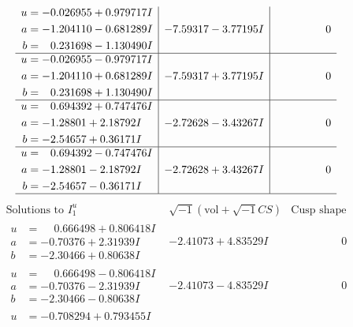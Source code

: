 \documentclass[1p]{elsarticle_modified}
\theoremstyle{definition}
\newcommand{\I}{\sqrt{-1}}
\begin{document}
$$\begin{array}{c|c|c}
\begin{aligned}
u &= -0.026955 + 0.979717 I \\
a &= -1.204110 - 0.681289 I \\
b &= \phantom{-}0.231698 - 1.130490 I\end{aligned}
 & -7.59317 - 3.77195 I & \phantom{-0.000000 } 0 \\ \hline\begin{aligned}
u &= -0.026955 - 0.979717 I \\
a &= -1.204110 + 0.681289 I \\
b &= \phantom{-}0.231698 + 1.130490 I\end{aligned}
 & -7.59317 + 3.77195 I & \phantom{-0.000000 } 0 \\ \hline\begin{aligned}
u &= \phantom{-}0.694392 + 0.747476 I \\
a &= -1.28801 + 2.18792 I \\
b &= -2.54657 + 0.36171 I\end{aligned}
 & -2.72628 - 3.43267 I & \phantom{-0.000000 } 0 \\ \hline\begin{aligned}
u &= \phantom{-}0.694392 - 0.747476 I \\
a &= -1.28801 - 2.18792 I \\
b &= -2.54657 - 0.36171 I\end{aligned}
 & -2.72628 + 3.43267 I & \phantom{-0.000000 } 0\\
 \hline 
 \end{array}$$\newpage$$\begin{array}{c|c|c}  
\text{Solutions to }I^u_{1}& \I (\text{vol} + \sqrt{-1}CS) & \text{Cusp shape}\\
 \hline 
\begin{aligned}
u &= \phantom{-}0.666498 + 0.806418 I \\
a &= -0.70376 + 2.31939 I \\
b &= -2.30466 + 0.80638 I\end{aligned}
 & -2.41073 + 4.83529 I & \phantom{-0.000000 } 0 \\ \hline\begin{aligned}
u &= \phantom{-}0.666498 - 0.806418 I \\
a &= -0.70376 - 2.31939 I \\
b &= -2.30466 - 0.80638 I\end{aligned}
 & -2.41073 - 4.83529 I & \phantom{-0.000000 } 0 \\ \hline\begin{aligned}
u &= -0.708294 + 0.793455 I \\

\end{aligned}
\end{array}$$
\end{document}
